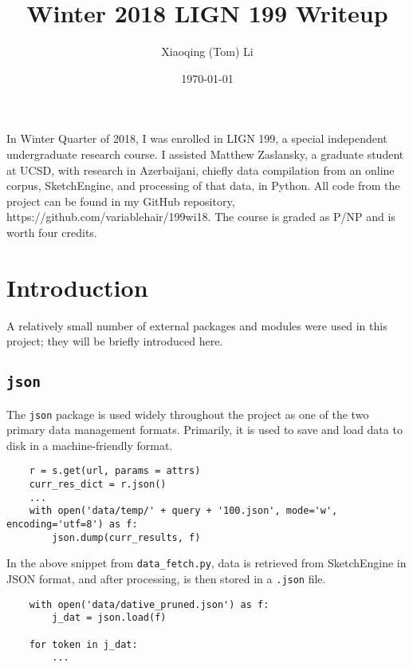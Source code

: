 \documentclass{article}      %
\title{Winter 2018 LIGN 199 Writeup}  %
\author{Xiaoqing (Tom) Li}      %
\date\today      %
\begin{document}
	
	\maketitle                   %
	
	In Winter Quarter of 2018, I was enrolled in LIGN 199, a special independent undergraduate research course. I assisted Matthew Zaslansky, a graduate student at UCSD, with research in Azerbaijani, chiefly data compilation from an online corpus, SketchEngine, and processing of that data, in Python. All code from the project can be found in my GitHub repository, https://github.com/variablehair/199wi18. The course is graded as P/NP and is worth four credits.
	
	\section{Introduction}
	
	A relatively small number of external packages and modules were used in this project; they will be briefly introduced here.
	
	\subsection{\texttt{json}}
	
	The \texttt{json} package is used widely throughout the project as one of the two primary data management formats. Primarily, it is used to save and load data to disk in a machine-friendly format.
	
	\begin{verbatim}
	r = s.get(url, params = attrs)
	curr_res_dict = r.json()
	...
	with open('data/temp/' + query + '100.json', mode='w', encoding='utf=8') as f:
		json.dump(curr_results, f)
	\end{verbatim}
	
	In the above snippet from \texttt{data\_fetch.py}, data is retrieved from SketchEngine in JSON format, and after processing, is then stored in a \texttt{.json} file.
	
	\begin{verbatim}
	with open('data/dative_pruned.json') as f:
		j_dat = json.load(f)
	
	for token in j_dat:
		...
	\end{verbatim}
	
\end{document}
